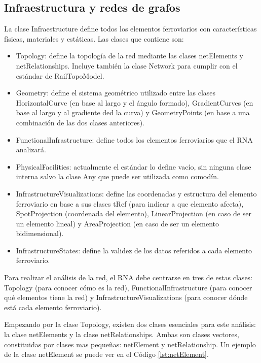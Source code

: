 \subsection{Infraestructura y redes de grafos}
    \label{sec:grafos}

    La clase Infraestructure define todos los elementos ferroviarios con características físicas, materiales y estáticas. Las clases que contiene son:

    \begin{itemize}
        \item Topology: define la topología de la red mediante las clases netElements y netRelationships. Incluye también la clase Network para cumplir con el estándar de RailTopoModel.
        \item Geometry: define el sistema geométrico utilizado entre las clases HorizontalCurve (en base al largo y el ángulo formado), GradientCurves (en base al largo y al gradiente ded la curva) y GeometryPoints (en base a una combinación de las dos clases anteriores).
        \item FunctionalInfrastructure: define todos los elementos ferroviarios que el RNA analizará.
        \item PhysicalFacilities: actualmente el estándar lo define vacío, sin ninguna clase interna salvo la clase Any que puede ser utilizada como comodín.
        \item InfrastructureVisualizations: define las coordenadas y estructura del elemento ferroviario en base a sus clases tRef (para indicar a que elemento afecta), SpotProjection (coordenada del elemento), LinearProjection (en caso de ser un elemento lineal) y AreaProjection (en caso de ser un elemento bidimensional).
        \item InfrastructureStates: define la validez de los datos referidos a cada elemento ferroviario.
    \end{itemize}

    Para realizar el análisis de la red, el RNA debe centrarse en tres de estas clases: Topology (para conocer cómo es la red), FunctionalInfrastructure (para conocer qué elementos tiene la red) y InfrastructureVisualizations (para conocer dónde está cada elemento ferroviario).

    Empezando por la clase Topology, existen dos clases esenciales para este análisis: la clase netElements y la clase netRelationships. Ambas son clases vectores, constituidas por clases mas pequeñas: netElement y netRelationship. Un ejemplo de la clase netElement se puede ver en el Código \ref{lst:netElement}.
    
